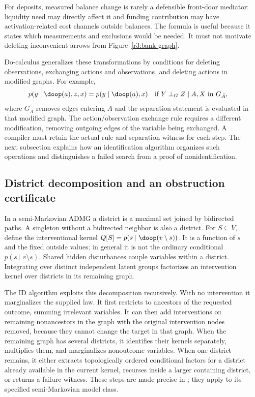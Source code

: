 For deposits, measured balance change is rarely a defensible front-door
mediator: liquidity need may directly affect it and funding contribution
may have activation-related cost channels outside balances. The formula
is useful because it states which measurements and exclusions would be
needed. It must not motivate deleting inconvenient arrows from
Figure~\ref{r3:bank-graph}.

Do-calculus generalizes these transformations by conditions for deleting
observations, exchanging actions and observations, and deleting actions
in modified graphs. For example,
\[
 p(y\mid\doop(a),z,x)=p(y\mid\doop(a),x)
 \quad\text{if }Y\perp_G Z\mid A,X\text{ in }G_{\bar A},
\]
where $G_{\bar A}$ removes edges entering $A$ and the separation statement
is evaluated in that modified graph. The action/observation exchange rule
requires a different modification, removing outgoing edges of the variable
being exchanged. A compiler must retain the actual rule and separation
witness for each step. The next subsection explains how an identification
algorithm organizes such operations and distinguishes a failed search
from a proof of nonidentification.

\subsection{District decomposition and an obstruction certificate}
\label{r3:id-algorithm}
In a semi-Markovian ADMG a district is a maximal set joined by bidirected
paths. A singleton without a bidirected neighbor is also a district.
For $S\subseteq V$, define the interventional kernel
$Q[S]=p(s\mid\doop(v\setminus s))$. It is a function of $s$ and the
fixed outside values; in general it is not the ordinary conditional
$p(s\mid v\setminus s)$. Shared hidden disturbances couple variables
within a district. Integrating over distinct independent latent groups
factorizes an intervention kernel over districts in its remaining graph.

The ID algorithm exploits this decomposition recursively. With no
intervention it marginalizes the supplied law. It first restricts to
ancestors of the requested outcome, summing irrelevant variables. It
can then add interventions on remaining nonancestors in the graph with
the original intervention nodes removed, because they cannot change the
target in that graph. When the remaining graph has several districts,
it identifies their kernels separately, multiplies them, and marginalizes
nonoutcome variables. When one district remains, it either extracts
topologically ordered conditional factors for a district already
available in the current kernel, recurses inside a larger containing
district, or returns a failure witness. These steps are made precise in
\citet[Section 4, Figure 2]{id2006}; they apply to its specified
semi-Markovian model class.


